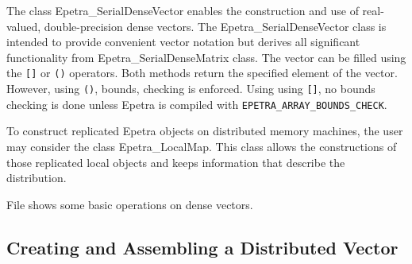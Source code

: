 The class Epetra\_SerialDenseVector enables the construction and use of
real-valued, double-precision dense vectors. The
Epetra\_SerialDenseVector class is intended to provide convenient vector
notation but derives all significant functionality from
Epetra\_SerialDenseMatrix class.  The vector can be filled using the
\verb![]! or \verb!()! operators.  Both methods return the specified
element of the vector.  However, using \verb!()!, bounds, checking is
enforced. Using using \verb![]!, no bounds checking is done unless
Epetra is compiled with \verb!EPETRA_ARRAY_BOUNDS_CHECK!.

\begin{remark}
  To construct replicated Epetra objects on distributed memory machines,
  the user may consider the class Epetra\_LocalMap. This class allows
  the constructions of those replicated local objects and keeps
  information that describe the distribution.
\end{remark}

File  shows some basic operations on dense vectors.


\subsection{Creating and Assembling a Distributed Vector}
\label{sec:distr_vec}


